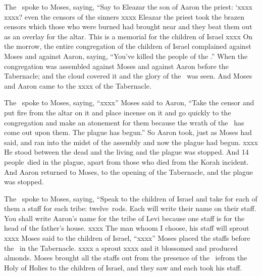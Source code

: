 
\begin{inparaenum}
   The \lord\ spoke to Moses, saying,%
   ``Say to Eleazar the son of Aaron the priest: `xxxx%
   xxxx? even the censors of the sinners xxxx%
   Eleazar the priest took the brazen censors which those who were burned had brought near and they beat them out as an overlay for the altar.%
   This is a memorial for the children of Israel xxxx%
   On the morrow, the entire congregation of the children of Israel complained against Moses and against Aaron, saying, ``You've killed the people of the \lord.''%
   When the congregation was assembled against Moses and against Aaron before the Tabernacle; and the cloud covered it and the glory of the \lord\ was seen.%
   And Moses and Aaron came to the xxxx of the Tabernacle.%

   The \lord\ spoke to Moses, saying,%
   ``xxxx''%
   Moses said to Aaron, ``Take the censor and put fire from the altar on it and place incense on it and go quickly to the congregation and make an atonement for them because the wrath of the \lord\ has come out upon them. The plague has begun.''%
   So Aaron took, just as Moses had said, and ran into the midst of the assembly and now the plague had begun. xxxx%
   He stood between the dead and the living and the plague was stopped.%
   And 14 people\understood{}\ died in the plague, apart from those who died from the Korah incident.%
   And Aaron returned to Moses, to the opening of the Tabernacle, and the plague was stopped.%

   The \lord\ spoke to Moses, saying,%
   ``Speak to the children of Israel and take for each of them a staff for each tribe: twelve~rods. Each will write their name on their staff.%
   You shall write Aaron's name for the tribe of Levi because one staff is for the head of the father's house.%
   xxxx%
   The man whoom I choose, his staff will sprout xxxx%
   Moses said to the children of Israel, ``xxxx''%
   Moses placed the staffs before the \lord\ in the Tabernacle.%
   xxxx a sprout xxxx and it blossomed and produced almonds.%
   Moses brought all the staffs out from the presence of the \lord\ ie{from the Holy of Holies} to the children of Israel, and they saw and each took his staff.%


\end{inparaenum}
